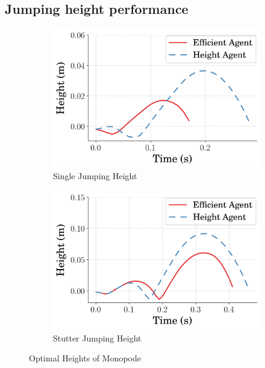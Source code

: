 \subsection{Jumping height performance}
\label{subsection:opt_height_performance}
% 
\begin{figure}[tb!]
    \centering
    \begin{subfigure}{.49\textwidth}
      \centering
      \includegraphics[width=\linewidth]{Figures/Ch2/best_One_RodPos_.png}
      \caption{Single Jumping Height}
      \label{fig:opt_one_rodpos}
    \end{subfigure}%
    \hfill
    \begin{subfigure}{.49\textwidth}
      \centering
      \includegraphics[width=\linewidth]{Figures/Ch2/best_Stutter_RodPos_.png}
       \caption{Stutter Jumping Height}
       \label{fig:opt_stutter_rodpos}
    \end{subfigure}
     \caption{Optimal Heights of Monopode}
     \label{fig:opt_rodpos}
\end{figure}
% 

